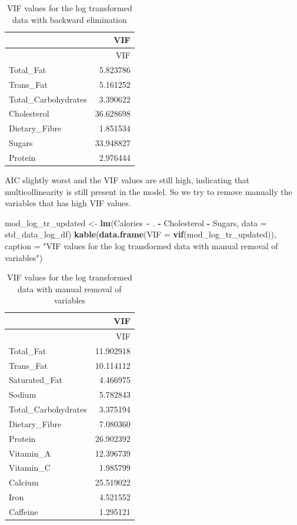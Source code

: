 \documentclass[
]{article}
\newenvironment{Shaded}{\begin{snugshade}}{\end{snugshade}}
\newcommand{\AttributeTok}[1]{\textcolor[rgb]{0.13,0.29,0.53}{#1}}
\newcommand{\FunctionTok}[1]{\textcolor[rgb]{0.13,0.29,0.53}{\textbf{#1}}}
\newcommand{\NormalTok}[1]{#1}
\newcommand{\OtherTok}[1]{\textcolor[rgb]{0.56,0.35,0.01}{#1}}
\newcommand{\SpecialCharTok}[1]{\textcolor[rgb]{0.81,0.36,0.00}{\textbf{#1}}}
\newcommand{\StringTok}[1]{\textcolor[rgb]{0.31,0.60,0.02}{#1}}
\begin{document}
\begin{longtable}[]{@{}lr@{}}
\caption{VIF values for the log transformed data with backward
elimination}\tabularnewline
\toprule\noalign{}
& VIF \\
\midrule\noalign{}
\endfirsthead
\toprule\noalign{}
& VIF \\
\midrule\noalign{}
\endhead
\bottomrule\noalign{}
\endlastfoot
Total\_Fat & 5.823786 \\
Trans\_Fat & 5.161252 \\
Total\_Carbohydrates & 3.390622 \\
Cholesterol & 36.628698 \\
Dietary\_Fibre & 1.851534 \\
Sugars & 33.948827 \\
Protein & 2.976444 \\
\end{longtable}

AIC slightly worst and the VIF values are still high, indicating that
multicollinearity is still present in the model. So we try to remove
manually the variables that has high VIF values.

\begin{Shaded}
\begin{Highlighting}[]
\NormalTok{mod\_log\_tr\_updated }\OtherTok{\textless{}{-}} \FunctionTok{lm}\NormalTok{(Calories }\SpecialCharTok{\textasciitilde{}}\NormalTok{ . }\SpecialCharTok{{-}}\NormalTok{ Cholesterol }\SpecialCharTok{{-}}\NormalTok{ Sugars,}
                         \AttributeTok{data =}\NormalTok{ std\_data\_log\_df)}
\FunctionTok{kable}\NormalTok{(}\FunctionTok{data.frame}\NormalTok{(}\AttributeTok{VIF =} \FunctionTok{vif}\NormalTok{(mod\_log\_tr\_updated)),}
      \AttributeTok{caption =} \StringTok{"VIF values for the log transformed data with }
\StringTok{      manual removal of variables"}\NormalTok{)}
\end{Highlighting}
\end{Shaded}

\begin{longtable}[]{@{}lr@{}}
\caption{VIF values for the log transformed data with manual removal of
variables}\tabularnewline
\toprule\noalign{}
& VIF \\
\midrule\noalign{}
\endfirsthead
\toprule\noalign{}
& VIF \\
\midrule\noalign{}
\endhead
\bottomrule\noalign{}
\endlastfoot
Total\_Fat & 11.902918 \\
Trans\_Fat & 10.114112 \\
Saturated\_Fat & 4.466975 \\
Sodium & 5.782843 \\
Total\_Carbohydrates & 3.375194 \\
Dietary\_Fibre & 7.080360 \\
Protein & 26.902392 \\
Vitamin\_A & 12.396739 \\
Vitamin\_C & 1.985799 \\
Calcium & 25.519022 \\
Iron & 4.521552 \\
Caffeine & 1.295121 \\
\end{longtable}
\end{document}

